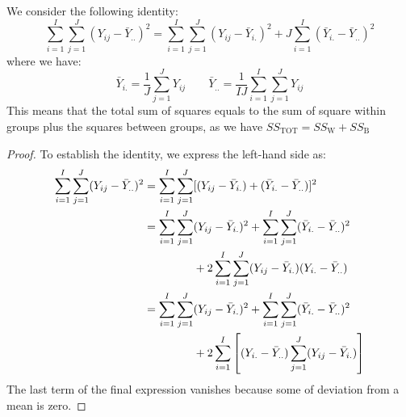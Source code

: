 \begin{lemma}
    We consider the following identity:
    \begin{equation*}
        \sum^I_{i=1}\sum^J_{j=1}(Y_{ij} - \bar{Y}_{..})^2 = \sum^I_{i=1}\sum^J_{j=1}(Y_{ij} - \bar{Y}_{i.})^2 + J\sum^I_{i=1}(\bar{Y}_{i.} - \bar{Y}_{..})^2
    \end{equation*}
    where we have:
    \begin{equation*}
        \bar{Y}_{i.} = \frac{1}{J}\sum^J_{j=1}Y_{ij} \qquad \bar{Y}_{..} = \frac{1}{IJ}\sum^I_{i=1}\sum^J_{j=1}Y_{ij}
    \end{equation*}
    This means that the total sum of squares equals to the sum of square within groups plus the squares between groups, as we have $SS_\text{TOT} = SS_\text{W} + SS_\text{B}$
\end{lemma}
\begin{proof}
    To establish the identity, we express the left-hand side as:
    \begin{equation*}
    \begin{aligned}
        \sum^I_{i=1}\sum^J_{j=1}(Y_{ij} - \bar{Y}_{..})^2 &= \sum^I_{i=1}\sum^J_{j=1}[(Y_{ij} - \bar{Y}_{i.}) + (\bar{Y}_{i.}  - \bar{Y}_{..})]^2 \\
        &= \begin{aligned}[t]
            \sum^I_{i=1}\sum^J_{j=1}&(Y_{ij} - \bar{Y}_{i.})^2 + \sum^I_{i=1}\sum^J_{j=1}(\bar{Y}_{i.} - \bar{Y}_{..})^2 \\
            &+ 2\sum^I_{i=1}\sum^J_{j=1}(Y_{ij} - \bar{Y}_{i.})(Y_{i.} - \bar{Y}_{..})
        \end{aligned} \\
        &= \begin{aligned}[t]
            \sum^I_{i=1}\sum^J_{j=1}&(Y_{ij} - \bar{Y}_{i.})^2 + \sum^I_{i=1}\sum^J_{j=1}(\bar{Y}_{i.} - \bar{Y}_{..})^2 \\
            &+ 2\sum^I_{i=1}\left[ (Y_{i.} - \bar{Y}_{..})\sum^J_{j=1}(Y_{ij} - \bar{Y}_{i.})  \right]
        \end{aligned}
    \end{aligned}
    \end{equation*}
    The last term of the final expression vanishes because some of deviation from a mean is zero. 
\end{proof}


